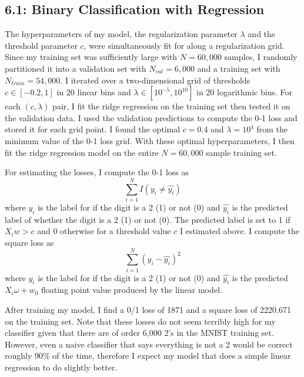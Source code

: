 \documentclass[12pt]{amsart}
\begin{document}
\subsection*{6.1: Binary Classification with Regression}

The hyperparameters of my model, the regularization parameter $\lambda$ and the threshold parameter $c$, were simultaneously fit for along a regularization grid.  Since my training set was sufficiently large with $N = 60,000$ samples, I randomly partitioned it into a validation set with $N_{val} = 6,000$ and a training set with $N_{train} = 54,000$.  I iterated over a two-dimensional grid of thresholds $c \in [-0.2,1]$ in 20 linear bins and $\lambda \in [10^{-5},10^{10}]$ in 20 logarithmic bins.  For each $(c,\lambda)$ pair, I fit the ridge regression on the training set then tested it on the validation data.  I used the validation predictions to compute the 0-1 loss and stored it for each grid point.  I found the optimal $c = 0.4$ and $\lambda = 10^4$ from the minimum value of the 0-1 loss grid.  With these optimal hyperparameters, I then fit the ridge regression model on the entire $N = 60,000$ sample training set.

For estimating the losses, I compute the 0-1 loss as
\begin{equation} \label{eqn:01_loss}
\sum_{i=1}^N I(y_i \neq \hat{y_i})
\end{equation}
where $y_i$ is the label for if the digit is a 2 (1) or not (0) and $\hat{y_i}$ is the predicted label of whether the digit is a 2 (1) or not (0).  The predicted label is set to 1 if $X_iw > c$ and 0 otherwise for a threshold value $c$ I estimated above.  I compute the square loss as
\begin{equation} \label{eqn:square_loss}
\sum_{i=1}^N (y_i - \hat{y_i})^2
\end{equation}
where $y_i$ is the label for if the digit is a 2 (1) or not (0) and $\hat{y_i}$ is the predicted $X_i \omega + w_0$ floating point value produced by the linear model.

After training my model, I find a 0/1 loss of 1871 and a square loss of 2220.671 on the training set.  Note that these losses do not seem terribly high for my classifier given that there are of order 6,000 2's in the MNIST training set.  However, even a naive classifier that says everything is not a 2 would be correct roughly $90\%$ of the time, therefore I expect my model that does a simple linear regression to do slightly better.
\end{document}
